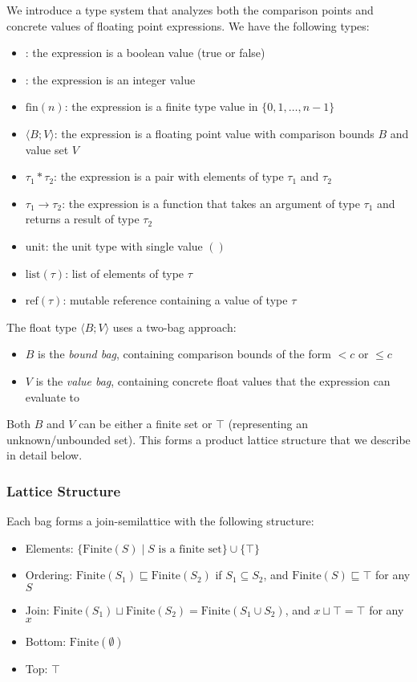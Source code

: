 \documentclass[acmsmall,screen,dvipsnames,x11names,nonacm,anonymous,review]{acmart}
\begin{document}
We introduce a type system that analyzes both the comparison points and concrete values of floating point expressions. We have the following types:
\begin{itemize}
    \item \bool: the expression is a boolean value (true or false)
    \item \intty: the expression is an integer value  
    \item $\text{fin}(n)$: the expression is a finite type value in $\{0, 1, \ldots, n-1\}$
    \item \float$\langle B; V \rangle$: the expression is a floating point value with comparison bounds $B$ and value set $V$
    \item $\tau_1 * \tau_2$: the expression is a pair with elements of type $\tau_1$ and $\tau_2$
    \item $\tau_1 \rightarrow \tau_2$: the expression is a function that takes an argument of type $\tau_1$ and returns a result of type $\tau_2$
    \item $\text{unit}$: the unit type with single value $()$
    \item $\text{list}(\tau)$: list of elements of type $\tau$
    \item $\text{ref}(\tau)$: mutable reference containing a value of type $\tau$
\end{itemize}

The float type \float$\langle B; V \rangle$ uses a two-bag approach:
\begin{itemize}
    \item $B$ is the \emph{bound bag}, containing comparison bounds of the form $< c$ or $\leq c$
    \item $V$ is the \emph{value bag}, containing concrete float values that the expression can evaluate to
\end{itemize}

Both $B$ and $V$ can be either a finite set or $\top$ (representing an unknown/unbounded set). This forms a product lattice structure that we describe in detail below.

\subsubsection{Lattice Structure}

Each bag forms a join-semilattice with the following structure:
\begin{itemize}
    \item Elements: $\{\text{Finite}(S) \mid S \text{ is a finite set}\} \cup \{\top\}$
    \item Ordering: $\text{Finite}(S_1) \sqsubseteq \text{Finite}(S_2)$ if $S_1 \subseteq S_2$, and $\text{Finite}(S) \sqsubseteq \top$ for any $S$
    \item Join: $\text{Finite}(S_1) \sqcup \text{Finite}(S_2) = \text{Finite}(S_1 \cup S_2)$, and $x \sqcup \top = \top$ for any $x$
    \item Bottom: $\text{Finite}(\emptyset)$
    \item Top: $\top$
\end{itemize}
\end{document}
